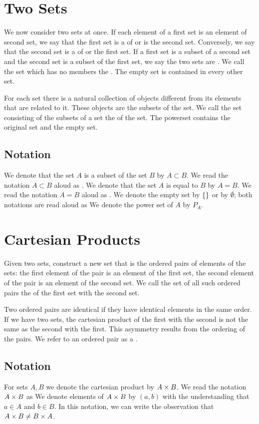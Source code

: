 \section{Two Sets}

We now consider two sets at once.
If each element of a first set is an element of second set, we say that the first set is a  of or is  the second set.
Conversely, we say that the second set is a  of or  the first set.
If a first set is a subset of a second set and the second set is a subset of the first set, we say the two sets are .
We call the set which has no members the .
The empty set is contained in every other set.

For each set there is a natural collection of objects different from its elements that are related to it.
These objects are the subsets of the set.
We call the set consisting of the subsets of a set the  of the set.
The powerset contains the original set and the empty set.

\subsection{Notation}
We denote that the set $A$ is a subset of the set $B$ by $A \subset B$.
We read the notation $A \subset B$ aloud as .
We denote that the set $A$ is equal to $B$ by $A = B$.
We read the notation $A = B$ aloud as .
We denote the empty set by $\{\}$ or by $\emptyset$; both notations are read aloud as 
We denote the power set of $A$ by $P_A$.

\section{Cartesian Products}

Given two sets, construct a new set that is the ordered pairs of elements of the sets: the first element of the pair is an element of the first set, the second element of the pair is an element of the second set.
We call the set of all such ordered pairs the  of the first set with the second set.

Two ordered pairs are identical if they have identical elements in the same order.
If we have two sets, the cartesian product of the first with the second is not the same as the second with the first.
This asymmetry results from the ordering of the pairs.
We refer to an ordered pair as a .

\subsection{Notation}
For sets $A, B$ we denote the cartesian product by $A \times B$.
We read the notation $A \times B$ as 
We denote elements of $A \times B$ by $(a, b)$ with the understanding that $a \in A$ and $b \in B$.
In this notation, we can write the observation that $A \times B \neq B \times A$.


